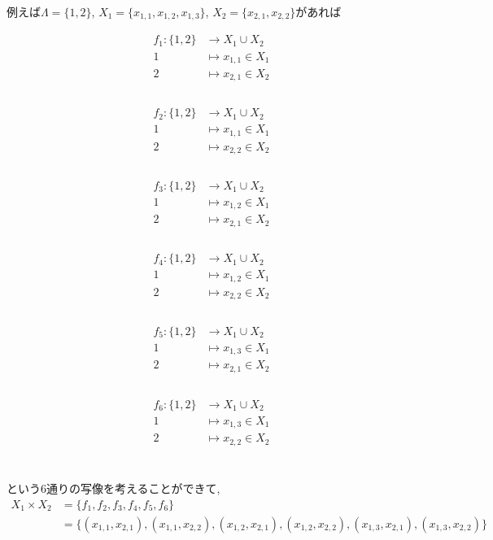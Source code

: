 \documentclass[a4j]{jsarticle}
\begin{document}
例えば$\Lambda=\{1,2\}$, $X_1=\{x_{1,1},x_{1,2},x_{1,3}\}$, $X_2=\{x_{2,1},x_{2,2}\}$があれば
\begin{multicols}{3}
  \begin{align*}
    f_1 : \{1,2\} & \rightarrow X_1 \cup X_2 \\
    1             & \mapsto x_{1,1} \in X_1  \\
    2             & \mapsto x_{2,1}\in X_2   \\
  \end{align*}\\
  \begin{align*}
    f_2 : \{1,2\} & \rightarrow X_1 \cup X_2 \\
    1             & \mapsto x_{1,1} \in X_1  \\
    2             & \mapsto x_{2,2}\in X_2   \\
  \end{align*}\\
  \begin{align*}
    f_3 : \{1,2\} & \rightarrow X_1 \cup X_2 \\
    1             & \mapsto x_{1,2} \in X_1  \\
    2             & \mapsto x_{2,1}\in X_2   \\
  \end{align*}\\
  \begin{align*}
    f_4 : \{1,2\} & \rightarrow X_1 \cup X_2 \\
    1             & \mapsto x_{1,2} \in X_1  \\
    2             & \mapsto x_{2,2}\in X_2   \\
  \end{align*}\\
  \begin{align*}
    f_5 : \{1,2\} & \rightarrow X_1 \cup X_2 \\
    1             & \mapsto x_{1,3} \in X_1  \\
    2             & \mapsto x_{2,1}\in X_2   \\
  \end{align*}\\
  \begin{align*}
    f_6 : \{1,2\} & \rightarrow X_1 \cup X_2 \\
    1             & \mapsto x_{1,3} \in X_1  \\
    2             & \mapsto x_{2,2}\in X_2   \\
  \end{align*}\\
\end{multicols}
という6通りの写像を考えることができて,
\begin{align*}
  X_1 \times X_2 & = \{f_1,f_2,f_3,f_4,f_5,f_6\}                                                                                     \\
                 & = \{(x_{1,1},x_{2,1}),(x_{1,1},x_{2,2}),(x_{1,2},x_{2,1}),(x_{1,2},x_{2,2}),(x_{1,3},x_{2,1}),(x_{1,3},x_{2,2})\}
\end{align*}\\
\end{document}
